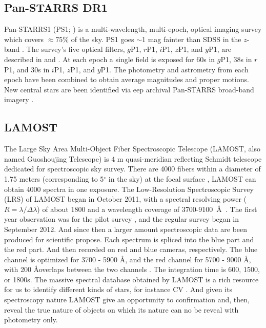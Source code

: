 \documentclass[fleqn,usenatbib]{mnras}
\begin{document}
\subsection{Pan-STARRS DR1}
\label{sec:PS1}

Pan-STARRS1 (PS1; \citealp{Kaiser:2010}) is a multi-wavelength, multi-epoch,
optical imaging survey which covers $\approx$75\% of the sky. PS1 goes $\sim$1 mag
fainter than SDSS in the $z$-band \citep{York:2000}. The survey’s five optical
filters, $g$P1, $r$P1, $i$P1, $z$P1, and $y$P1, are described in
\citet{Stubbs:2010} and \citet{Tonry:2012}. At each epoch a single field
is exposed for 60s in $g$P1, 38s in $r$P1, and 30s in $i$P1, $z$P1,
and $y$P1. The photometry and astrometry from each epoch
have been combined to obtain average magnitudes and proper
motions. New central stars are been identified via
eep archival Pan-STARRS broad-band imagery \citep{Tan:2023}. 

\subsection{LAMOST}
\label{sec:lamost}

The Large Sky Area Multi-Object Fiber Spectroscopic Telescope
(LAMOST, also named Guoshoujing Telescope) is 4 m quasi-meridian reflecting
Schmidt telescope dedicated for spectroscopic sky survey.
There are 4000 fibers within a diameter of 1.75 meters (corresponding
to 5$^{\circ}$ in the sky) at the focal surface \citep{Cui:2012}, LAMOST can
obtain 4000 spectra in one exposure.
The Low-Resolution Spectroscopic Survey (LRS) of LAMOST
began in October 2011, with a spectral resolving power ($R = \lambda/\Delta\lambda$)
of about 1800 and a wavelength coverage of
3700-9100~\AA~\citep{Zhao:2012}. The first year observation was
for the pilot survey \citep{Luo:2012, Zhao:2012},
and the regular survey began in September 2012. And since then
a larger amount  spectroscopic data are been produced for
scientific propose. Each spectrum is spliced into the blue part and the red part.
And then recorded on red and blue cameras, respectively.
The blue channel is optimized for 3700 - 5900  \AA, and the red channel for
5700 - 9000  \AA, with 200 \AA overlaps between the two channels \citep{Yao:2019}.
The integration time is 600, 1500, or 1800s. The massive spectral
database obtained by LAMOST is a rich resource for us to identify
different kinds of stars, for instance CV \citep{Sun:2021}. And given
its spectroscopy nature LAMOST give an opportunity to confirmation and, then,
reveal the true nature of objects on which its nature
can no be reveal with photometry only.
\end{document}
